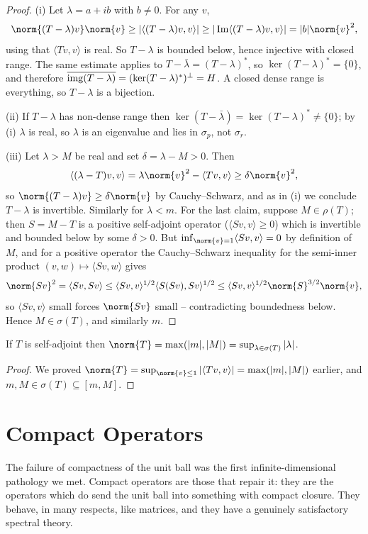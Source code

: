 \documentclass[a4paper]{scrartcl}
\newcommand{\ip}[2]{\langle #1, #2 \rangle}
\begin{document}
\begin{proof}
	(i) Let $\lambda = a+ib$ with $b \neq 0$. For any $v$,
	$$\norm{(T-\lambda)v}\norm{v}\geq|\ip{(T-\lambda)v}{v}|\geq|\im\ip{(T-\lambda)v}{v}| = |b|\norm{v}^2,$$
	using that $\ip{Tv}{v}$ is real. So $T-\lambda$ is bounded below, hence injective with closed range. The same estimate applies to $T - \bar\lambda = (T-\lambda)^*$, so $\ker(T-\lambda)^*=\{0\}$, and therefore $\overline{\operatorname{img}(T-\lambda)} = (\ker(T-\lambda)^*)^\perp = H$. A closed dense range is everything, so $T-\lambda$ is a bijection.

	(ii) If $T-\lambda$ has non-dense range then $\ker(T-\bar\lambda) = \ker(T-\lambda)^* \neq\{0\}$; by (i) $\lambda$ is real, so $\lambda$ is an eigenvalue and lies in $\sigma_p$, not $\sigma_r$.

	(iii) Let $\lambda>M$ be real and set $\delta = \lambda - M>0$. Then
	$$\ip{(\lambda - T)v}{v} = \lambda\norm{v}^2 - \ip{Tv}{v}\geq\delta\norm{v}^2,$$
	so $\norm{(T-\lambda)v}\geq\delta\norm{v}$ by Cauchy--Schwarz, and as in (i) we conclude $T-\lambda$ is invertible. Similarly for $\lambda<m$. For the last claim, suppose $M \in \rho(T)$; then $S = M - T$ is a positive self-adjoint operator ($\ip{Sv}{v}\geq0$) which is invertible and bounded below by some $\delta>0$. But $\inf_{\norm{v}=1}\ip{Sv}{v} = 0$ by definition of $M$, and for a positive operator the Cauchy--Schwarz inequality for the semi-inner product $(v,w)\mapsto\ip{Sv}{w}$ gives
	$$\norm{Sv}^2 = \ip{Sv}{Sv}\leq\ip{Sv}{v}^{1/2}\ip{S(Sv)}{Sv}^{1/2}\leq \ip{Sv}{v}^{1/2}\norm{S}^{3/2}\norm{v},$$
	so $\ip{Sv}{v}$ small forces $\norm{Sv}$ small -- contradicting boundedness below. Hence $M\in\sigma(T)$, and similarly $m$.
\end{proof}

\begin{corollary}
	If $T$ is self-adjoint then $\norm{T} = \max(|m|,|M|) = \sup_{\lambda\in\sigma(T)}|\lambda|$.
\end{corollary}

\begin{proof}
	We proved $\norm{T} = \sup_{\norm{v}\leq1}|\ip{Tv}{v}| = \max(|m|,|M|)$ earlier, and $m, M \in \sigma(T)\subseteq[m,M]$.
\end{proof}

\section{Compact Operators}

The failure of compactness of the unit ball was the first infinite-dimensional pathology we met. Compact operators are those that repair it: they are the operators which do send the unit ball into something with compact closure. They behave, in many respects, like matrices, and they have a genuinely satisfactory spectral theory.
\end{document}
